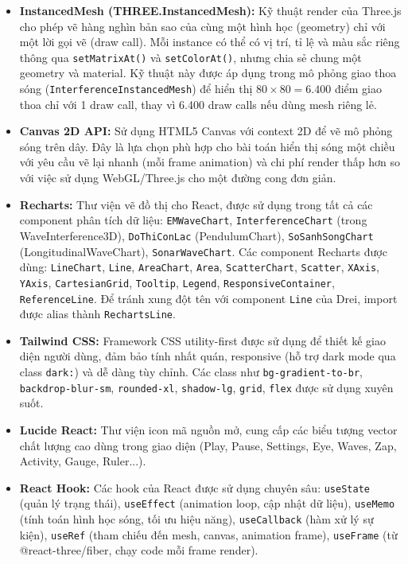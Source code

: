 \begin{itemize}
\begin{itemize}
        \item \textbf{InstancedMesh (THREE.InstancedMesh):} Kỹ thuật render của Three.js cho phép vẽ hàng nghìn bản sao của cùng một hình học (geometry) chỉ với một lời gọi vẽ (draw call). Mỗi instance có thể có vị trí, tỉ lệ và màu sắc riêng thông qua \texttt{setMatrixAt()} và \texttt{setColorAt()}, nhưng chia sẻ chung một geometry và material. Kỹ thuật này được áp dụng trong mô phỏng giao thoa sóng (\texttt{InterferenceInstancedMesh}) để hiển thị $80 \times 80 = 6.400$ điểm giao thoa chỉ với 1 draw call, thay vì 6.400 draw calls nếu dùng mesh riêng lẻ.
        \item \textbf{Canvas 2D API:} Sử dụng HTML5 Canvas với context 2D để vẽ mô phỏng sóng trên dây. Đây là lựa chọn phù hợp cho bài toán hiển thị sóng một chiều với yêu cầu vẽ lại nhanh (mỗi frame animation) và chi phí render thấp hơn so với việc sử dụng WebGL/Three.js cho một đường cong đơn giản.
        \item \textbf{Recharts:} Thư viện vẽ đồ thị cho React, được sử dụng trong tất cả các component phân tích dữ liệu: \texttt{EMWaveChart}, \texttt{InterferenceChart} (trong WaveInterference3D), \texttt{DoThiConLac} (PendulumChart), \texttt{SoSanhSongChart} (LongitudinalWaveChart), \texttt{SonarWaveChart}. Các component Recharts được dùng: \texttt{LineChart}, \texttt{Line}, \texttt{AreaChart}, \texttt{Area}, \texttt{ScatterChart}, \texttt{Scatter}, \texttt{XAxis}, \texttt{YAxis}, \texttt{CartesianGrid}, \texttt{Tooltip}, \texttt{Legend}, \texttt{ResponsiveContainer}, \texttt{ReferenceLine}. Để tránh xung đột tên với component \texttt{Line} của Drei, import được alias thành \texttt{RechartsLine}.
        \item \textbf{Tailwind CSS:} Framework CSS utility-first được sử dụng để thiết kế giao diện người dùng, đảm bảo tính nhất quán, responsive (hỗ trợ dark mode qua class \texttt{dark:}) và dễ dàng tùy chỉnh. Các class như \texttt{bg-gradient-to-br}, \texttt{backdrop-blur-sm}, \texttt{rounded-xl}, \texttt{shadow-lg}, \texttt{grid}, \texttt{flex} được sử dụng xuyên suốt.
        \item \textbf{Lucide React:} Thư viện icon mã nguồn mở, cung cấp các biểu tượng vector chất lượng cao dùng trong giao diện (Play, Pause, Settings, Eye, Waves, Zap, Activity, Gauge, Ruler...).
        \item \textbf{React Hook:} Các hook của React được sử dụng chuyên sâu: \texttt{useState} (quản lý trạng thái), \texttt{useEffect} (animation loop, cập nhật dữ liệu), \texttt{useMemo} (tính toán hình học sóng, tối ưu hiệu năng), \texttt{useCallback} (hàm xử lý sự kiện), \texttt{useRef} (tham chiếu đến mesh, canvas, animation frame), \texttt{useFrame} (từ @react-three/fiber, chạy code mỗi frame render).
    \end{itemize}
\end{itemize}

